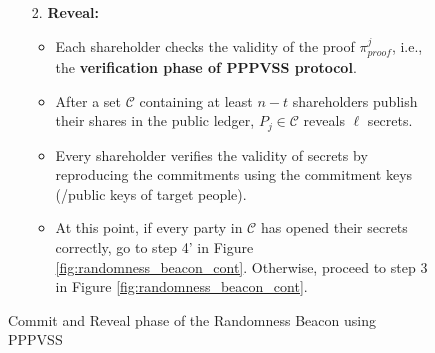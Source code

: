 \begin{figure}[ht]
\begin{tcolorbox}[title=\textbf{Randomness Beacon using PPPVSS}, width=0.9\textwidth, colframe=blue!75!black, colback=blue!10, sharp corners]
\begin{enumerate}
        \item [2.]\textbf{Reveal:}
        \begin{itemize}
            \item Each shareholder checks the validity of the proof 
            $\pi_{proof}^j$, i.e., the \textbf{verification phase of PPPVSS protocol}.
            \item After a set $\mathcal{C}$ containing at least $n-t$ 
            shareholders publish their shares in the public ledger, 
            $P_j\in\mathcal{C}$ reveals $\ell$ secrets.
            \item Every shareholder verifies the validity of secrets by 
            reproducing the commitments using the commitment keys (/public keys 
            of target people).
            \item At this point, if every party in $\mathcal{C}$ has opened 
            their secrets correctly, go to step 4' in Figure \ref{fig:randomness_beacon_cont}. 
            Otherwise, proceed to step 3 in Figure \ref{fig:randomness_beacon_cont}.
        \end{itemize}
    \end{enumerate}
    \end{tcolorbox}
    \caption{Commit and Reveal phase of the Randomness Beacon using PPPVSS}
    \label{fig:randomness_beacon}
\end{figure}